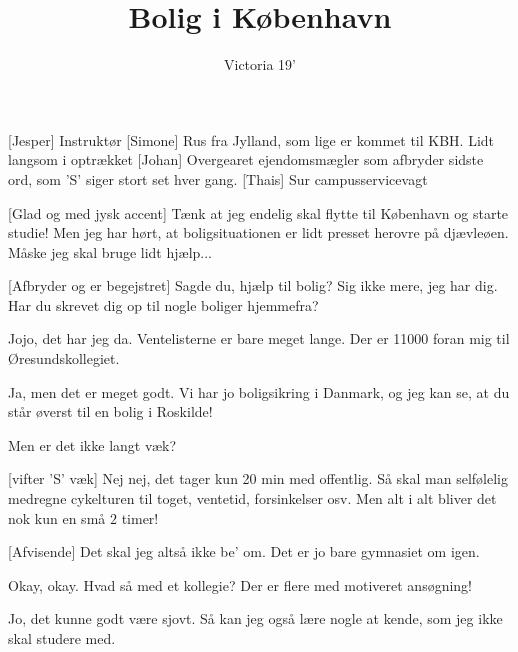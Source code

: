 \documentclass[a4paper,11pt]{article}
\title{Bolig i København}
\author{Victoria 19'}
\begin{document}
\maketitle

\begin{roles}
[Jesper] Instruktør
[Simone] Rus fra Jylland, som lige er kommet til KBH. Lidt langsom i optrækket
[Johan] Overgearet ejendomsmægler som afbryder sidste ord, som 'S' siger stort set hver gang. 
[Thais] Sur campusservicevagt 
\end{roles}

\begin{props}
\end{props}


\begin{sketch}


[Glad og med jysk accent] Tænk at jeg endelig skal flytte til København og starte studie! Men jeg har hørt, at boligsituationen er lidt presset herovre på djævleøen. Måske jeg skal bruge lidt hjælp... 


[Afbryder og er begejstret] Sagde du, hjælp til bolig?  
Sig ikke mere, jeg har dig. Har du skrevet dig op til nogle boliger hjemmefra?

 Jojo, det har jeg da. Ventelisterne er bare meget lange. Der er 11000 foran mig til Øresundskollegiet.

 Ja, men det er meget godt. Vi har jo boligsikring i Danmark, og jeg kan se, at du står øverst til en bolig i Roskilde! 

 Men er det ikke langt væk?

[vifter 'S' væk] Nej nej, det tager kun 20 min med offentlig. Så skal man selfølelig medregne cykelturen til toget, ventetid, forsinkelser osv. Men alt i alt bliver det nok kun en små $2$ timer!

[Afvisende] Det skal jeg altså ikke be' om. Det er jo bare gymnasiet om igen. 

 Okay, okay. Hvad så med et kollegie? Der er flere med motiveret ansøgning!

 Jo, det kunne godt være sjovt. Så kan jeg også lære nogle at kende, som jeg ikke skal studere med.


\end{sketch}
\end{document}
